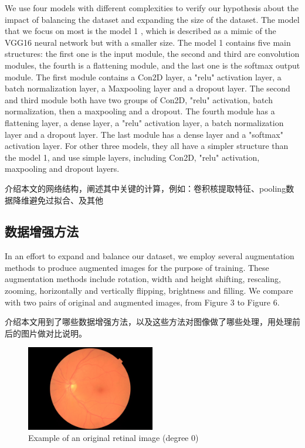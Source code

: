 \documentclass{ijisa}
\begin{document}
We use four models \cite{model1}\cite{model2}\cite{model3}\cite{chollet2016building} with different complexities to verify our hypothesis about the impact of balancing the dataset and expanding the size of the dataset. The model that we focus on most is the model 1 \cite{model1}, which is described as a mimic of the VGG16 neural network but with a smaller size. The model 1 contains five main structures: the first one is the input module, the second and third are convolution modules, the fourth is a flattening module, and the last one is the softmax output module. The first module contains a Con2D layer, a "relu" activation layer, a batch normalization layer, a Maxpooling layer and a dropout layer. The second and third module both have two groups of Con2D, "relu" activation, batch normalization, then a maxpooling and a dropout. The fourth module has a flattening layer, a dense layer, a "relu" activation layer, a batch normalization layer and a dropout layer. The last module has a dense layer and a "softmax" activation layer. For other three models, they all have a simpler structure than the model 1, and use simple layers, including Con2D, "relu" activation, maxpooling and dropout layers.

介绍本文的网络结构，阐述其中关键的计算，例如：卷积核提取特征、pooling数据降维避免过拟合、及其他

\subsection{数据增强方法}
In an effort to expand and balance our dataset, we employ several augmentation methods to produce augmented images for the purpose of training. These augmentation methods include rotation, width and height shifting, rescaling, zooming, horizontally and vertically flipping, brightness and filling. We compare with two pairs of original and augmented images, from Figure 3 to Figure 6.  

介绍本文用到了哪些数据增强方法，以及这些方法对图像做了哪些处理，用处理前后的图片做对比说明。
\begin{figure}[h]
\includegraphics[width=0.5\textwidth]{figures/zero.31_leftN.jpeg}
\caption{Example of an original retinal image (degree 0)}
\end{figure}
\end{document}
